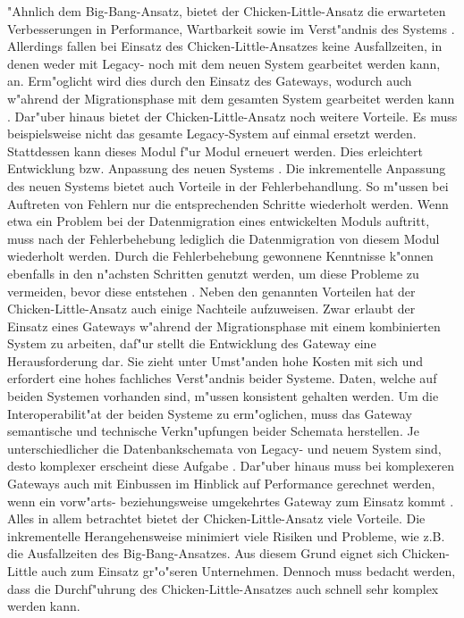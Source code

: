 \lb
"Ahnlich dem Big-Bang-Ansatz, bietet der Chicken-Little-Ansatz die erwarteten Verbesserungen in Performance, Wartbarkeit sowie im Verst"andnis des Systems \citep[S.~108]{bisbal-1999}. Allerdings fallen bei Einsatz des Chicken-Little-Ansatzes keine Ausfallzeiten, in denen weder mit Legacy- noch mit dem neuen System gearbeitet werden kann, an. Erm"oglicht wird dies durch den Einsatz des Gateways, wodurch auch w"ahrend der Migrationsphase mit dem gesamten System gearbeitet werden kann \citep[S.~2]{wuLawless-1997}. Dar"uber hinaus bietet der Chicken-Little-Ansatz noch weitere Vorteile. Es muss beispielsweise nicht das gesamte Legacy-System auf einmal ersetzt werden. Stattdessen kann dieses Modul f"ur Modul erneuert werden. Dies erleichtert Entwicklung bzw. Anpassung des neuen Systems \citep[S.~3]{brodie-1993}. Die inkrementelle Anpassung des neuen Systems bietet auch Vorteile in der Fehlerbehandlung. So m"ussen bei Auftreten von Fehlern nur die entsprechenden Schritte wiederholt werden. Wenn etwa ein Problem bei der Datenmigration eines entwickelten Moduls auftritt, muss nach der Fehlerbehebung lediglich die Datenmigration von diesem Modul wiederholt werden. Durch die Fehlerbehebung gewonnene Kenntnisse k"onnen ebenfalls in den n"achsten Schritten genutzt werden, um diese Probleme zu vermeiden, bevor diese entstehen \citep[S.~3]{brodie-1993}.
\lb
Neben den genannten Vorteilen hat der Chicken-Little-Ansatz auch einige Nachteile aufzuweisen. Zwar erlaubt der Einsatz eines Gateways w"ahrend der Migrationsphase mit einem kombinierten System zu arbeiten, daf"ur stellt die Entwicklung des Gateway eine Herausforderung dar. Sie zieht unter Umst"anden hohe Kosten mit sich und erfordert eine hohes fachliches Verst"andnis beider Systeme. Daten, welche auf beiden Systemen vorhanden sind, m"ussen konsistent gehalten werden. Um die Interoperabilit"at der beiden Systeme zu erm"oglichen, muss das Gateway semantische und technische Verkn"upfungen beider Schemata herstellen. Je unterschiedlicher die Datenbankschemata von Legacy- und neuem System sind, desto komplexer erscheint diese Aufgabe \citep[S.~2f.]{wuLawless-1997}. Dar"uber hinaus muss bei komplexeren Gateways auch mit Einbussen im Hinblick auf Performance gerechnet werden, wenn ein vorw"arts- beziehungsweise umgekehrtes Gateway zum Einsatz kommt \citep[S.~109]{bisbal-1999}.
\lb
Alles in allem betrachtet bietet der Chicken-Little-Ansatz viele Vorteile. Die inkrementelle Herangehensweise minimiert viele Risiken und Probleme, wie z.B. die Ausfallzeiten des Big-Bang-Ansatzes. Aus diesem Grund eignet sich Chicken-Little auch zum Einsatz gr"o"seren Unternehmen. Dennoch muss bedacht werden, dass die Durchf"uhrung des Chicken-Little-Ansatzes auch schnell sehr komplex werden kann.

